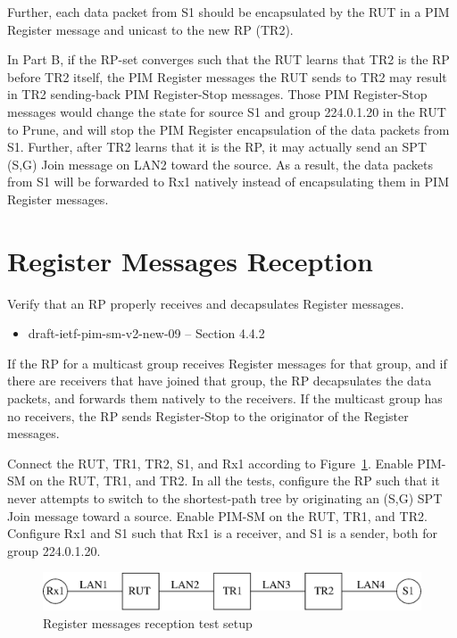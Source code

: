 \documentclass[11pt]{report}
\begin{document}
\begin{itemize}
  Further, each data packet from S1 should be encapsulated by the RUT in a PIM
  Register message and unicast to the new RP (TR2).

\end{itemize}


In Part B, if the RP-set converges such that the RUT learns that TR2 is the RP
before TR2 itself, the PIM Register messages the RUT sends to TR2 may result
in TR2 sending-back PIM Register-Stop messages. Those PIM Register-Stop
messages would change the state for source S1 and group 224.0.1.20 in the RUT
to Prune, and will stop the PIM Register encapsulation of the data packets
from S1. Further, after TR2 learns that it is the RP, it may actually send an
SPT (S,G) Join message on LAN2 toward the source. As a result, the data
packets from S1 will be forwarded to Rx1 natively instead of encapsulating
them in PIM Register messages.

\newpage
\section{Register Messages Reception}

Verify that an RP properly receives and decapsulates Register messages.

\begin{itemize}
  \item draft-ietf-pim-sm-v2-new-09 -- Section 4.4.2
\end{itemize}

If the RP for a multicast group receives Register messages for that group,
and if there are receivers that have joined that group, the RP decapsulates
the data packets, and forwards them natively to the receivers. If the
multicast group has no receivers, the RP sends Register-Stop to the originator
of the Register messages.

Connect the RUT, TR1, TR2, S1, and Rx1 according to
Figure~\ref{fig:pim_test_3_3_register_messages_reception}.
Enable PIM-SM on the RUT,
TR1, and TR2. In all the tests, configure the RP such that it never attempts to
switch to the shortest-path tree by originating an (S,G) SPT Join message
toward a source. Enable PIM-SM on the RUT, TR1, and TR2.  Configure Rx1 and S1
such that Rx1 is a receiver, and S1 is a sender, both for group 224.0.1.20.


\begin{figure}[htbp]
  \begin{center}
    \includegraphics[scale=0.8]{figs/pim_test_3_3_register_messages_reception}
    \caption{Register messages reception test setup}
    \label{fig:pim_test_3_3_register_messages_reception}
  \end{center}
\end{figure}
\end{document}
